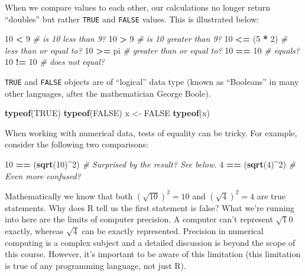 \documentclass[]{book}
\newenvironment{Shaded}{\begin{snugshade}}{\end{snugshade}}
\newcommand{\CommentTok}[1]{\textcolor[rgb]{0.56,0.35,0.01}{\textit{#1}}}
\newcommand{\DecValTok}[1]{\textcolor[rgb]{0.00,0.00,0.81}{#1}}
\newcommand{\KeywordTok}[1]{\textcolor[rgb]{0.13,0.29,0.53}{\textbf{#1}}}
\newcommand{\NormalTok}[1]{#1}
\newcommand{\OperatorTok}[1]{\textcolor[rgb]{0.81,0.36,0.00}{\textbf{#1}}}
\newcommand{\OtherTok}[1]{\textcolor[rgb]{0.56,0.35,0.01}{#1}}
\newcommand{\StringTok}[1]{\textcolor[rgb]{0.31,0.60,0.02}{#1}}
\theoremstyle{definition}
\theoremstyle{definition}
\theoremstyle{definition}
\theoremstyle{remark}
\begin{document}
When we compare values to each other, our calculations no longer return
``doubles'' but rather \texttt{TRUE} and \texttt{FALSE} values. This is
illustrated below:

\begin{Shaded}
\begin{Highlighting}[]
\DecValTok{10} \OperatorTok{<}\StringTok{ }\DecValTok{9}  \CommentTok{# is 10 less than 9?}
\DecValTok{10} \OperatorTok{>}\StringTok{ }\DecValTok{9}  \CommentTok{# is 10 greater than 9?}
\DecValTok{10} \OperatorTok{<=}\StringTok{ }\NormalTok{(}\DecValTok{5} \OperatorTok{*}\StringTok{ }\DecValTok{2}\NormalTok{) }\CommentTok{# less than or equal to?}
\DecValTok{10} \OperatorTok{>=}\StringTok{ }\NormalTok{pi }\CommentTok{# greater than or equal to?}
\DecValTok{10} \OperatorTok{==}\StringTok{ }\DecValTok{10} \CommentTok{# equals?}
\DecValTok{10} \OperatorTok{!=}\StringTok{ }\DecValTok{10} \CommentTok{# does not equal?}
\end{Highlighting}
\end{Shaded}

\texttt{TRUE} and \texttt{FALSE} objects are of ``logical'' data type
(known as ``Booleans'' in many other languages, after the mathematician
George Boole).

\begin{Shaded}
\begin{Highlighting}[]
\KeywordTok{typeof}\NormalTok{(}\OtherTok{TRUE}\NormalTok{)}
\KeywordTok{typeof}\NormalTok{(}\OtherTok{FALSE}\NormalTok{)}
\NormalTok{x <-}\StringTok{ }\OtherTok{FALSE}
\KeywordTok{typeof}\NormalTok{(x)}
\end{Highlighting}
\end{Shaded}

When working with numerical data, tests of equality can be tricky. For
example, consider the following two comparisons:

\begin{Shaded}
\begin{Highlighting}[]
\DecValTok{10} \OperatorTok{==}\StringTok{ }\NormalTok{(}\KeywordTok{sqrt}\NormalTok{(}\DecValTok{10}\NormalTok{)}\OperatorTok{^}\DecValTok{2}\NormalTok{) }\CommentTok{# Surprised by the result? See below.}
\DecValTok{4} \OperatorTok{==}\StringTok{ }\NormalTok{(}\KeywordTok{sqrt}\NormalTok{(}\DecValTok{4}\NormalTok{)}\OperatorTok{^}\DecValTok{2}\NormalTok{) }\CommentTok{# Even more confused?}
\end{Highlighting}
\end{Shaded}

Mathematically we know that both \((\sqrt{10})^2 = 10\) and
\((\sqrt{4})^2 = 4\) are true statements. Why does R tell us the first
statement is false? What we're running into here are the limits of
computer precision. A computer can't represent \(\sqrt 10\) exactly,
whereas \(\sqrt 4\) can be exactly represented. Precision in numerical
computing is a complex subject and a detailed discussion is beyond the
scope of this course. However, it's important to be aware of this
limitation (this limitation is true of any programming language, not
just R).
\end{document}
